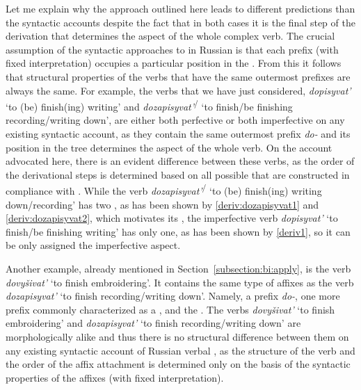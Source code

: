 Let me explain why the approach outlined here leads to different predictions than the syntactic accounts despite the fact that in both cases it is the final step of the derivation that determines the aspect of the whole complex verb. The crucial assumption of the syntactic approaches to  in Russian is that each prefix (with fixed interpretation) occupies a particular position in the . From this it follows that structural properties of the verbs that have the same outermost prefixes are always the same. For example, the verbs that we have just considered, \textit{dopisyvat'}\textsuperscript{\IPF} `to (be) finish(ing) writing' and \textit{dozapisyvat'}\textsuperscript{\IPF\slash\PF} `to finish/be finishing recording/writing down', are either both perfective or both imperfective on any existing syntactic  account, as they contain the same outermost prefix \textit{do-} and its position in the tree determines the aspect of the whole verb. On the account advocated here, there is an evident difference between these verbs, as the order of the derivational steps is determined based on all possible  that are constructed in compliance with . While the verb \textit{dozapisyvat'}\textsuperscript{\IPF\slash\PF} `to (be) finish(ing) writing down/recording' has two , as has been shown by \ref{deriv:dozapisyvat1} and \ref{deriv:dozapisyvat2}, which motivates its , the imperfective verb \textit{dopisyvat'}\textsuperscript{\IPF} `to finish/be finishing writing' has only one, as has been shown by \ref{deriv1}, so it can be only assigned the imperfective aspect.

Another example, already mentioned in Section~\ref{subsection:bi:apply}, is the verb \textit{dovy\v{s}ivat'} `to finish embroidering'. It contains the same type of affixes as the verb \textit{dozapisyvat'} `to finish recording/writing down'. Namely, a  prefix \textit{do-}, one more prefix commonly characterized as a , and the . The verbs \textit{dovy\v{s}ivat'} `to finish embroidering' and \textit{dozapisyvat'} `to finish recording/writing down' are morphologically alike and thus there is no structural difference between them on any existing syntactic account of Russian verbal , as the structure of the verb and the order of the affix attachment is determined only on the basis of the syntactic properties of the affixes (with fixed interpretation).
 
